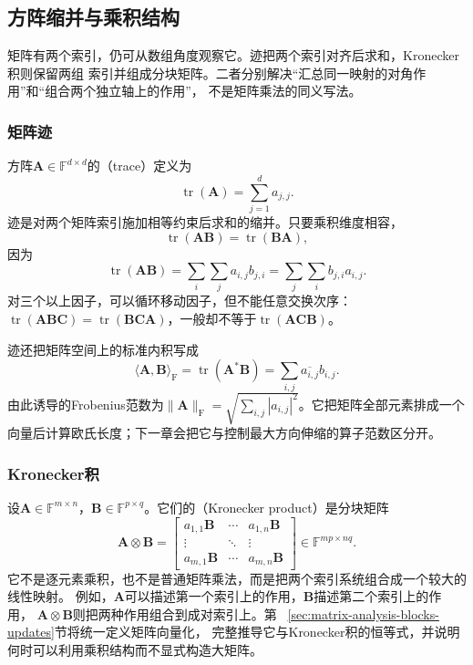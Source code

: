 \subsection{方阵缩并与乘积结构}

矩阵有两个索引，仍可从数组角度观察它。迹把两个索引对齐后求和，Kronecker积则保留两组
索引并组成分块矩阵。二者分别解决“汇总同一映射的对角作用”和“组合两个独立轴上的作用”，
不是矩阵乘法的同义写法。

\subsubsection{矩阵迹}

方阵$\bm{A}\in\mathbb{F}^{d\times d}$的（trace）定义为
\[
  \operatorname{tr}(\bm{A})
  =
  \sum_{j=1}^{d}a_{j,j}.
\]
迹是对两个矩阵索引施加相等约束后求和的缩并。只要乘积维度相容，
\begin{equation}
  \operatorname{tr}(\bm{A}\bm{B}) = \operatorname{tr}(\bm{B}\bm{A}), \label{eq:linear-algebra-trace-cyclic}
\end{equation}
因为
\[
  \operatorname{tr}(\bm{A}\bm{B})
  =
  \sum_i\sum_j a_{i,j}b_{j,i}
  =
  \sum_j\sum_i b_{j,i}a_{i,j}.
\]
对三个以上因子，可以循环移动因子，但不能任意交换次序：$\operatorname{tr}(\bm{A}\bm{B}\bm{C}) =\operatorname{tr}(\bm{B}\bm{C}\bm{A})$，一般却不等于$\operatorname{tr}(\bm{A}\bm{C}\bm{B})$。

迹还把矩阵空间上的标准内积写成
\[
  \langle\bm{A},\bm{B}\rangle_{\mathrm{F}}
  =
  \operatorname{tr}(\bm{A}^{*}\bm{B})
  =
  \sum_{i,j}\overline{a_{i,j}}b_{i,j}.
\]
由此诱导的Frobenius范数为$\lVert\bm{A}\rVert_{\mathrm{F}} =\sqrt{\sum_{i,j}|a_{i,j}|^2}$。它把矩阵全部元素排成一个向量后计算欧氏长度；下一章会把它与控制最大方向伸缩的算子范数区分开。

\subsubsection{Kronecker积}

设$\bm{A}\in\mathbb{F}^{m\times n}$，$\bm{B}\in\mathbb{F}^{p\times q}$。它们的（Kronecker product）是分块矩阵
\begin{equation}
  \bm{A}\otimes\bm{B} = \begin{bmatrix} a_{1,1}\bm{B}&\cdots&a_{1,n}\bm{B}\\ \vdots&\ddots&\vdots\\ a_{m,1}\bm{B}&\cdots&a_{m,n}\bm{B} \end{bmatrix} \in\mathbb{F}^{mp\times nq}. \label{eq:linear-algebra-kronecker-product}
\end{equation}
它不是逐元素乘积，也不是普通矩阵乘法，而是把两个索引系统组合成一个较大的线性映射。
例如，$\bm{A}$可以描述第一个索引上的作用，$\bm{B}$描述第二个索引上的作用，
$\bm{A}\otimes\bm{B}$则把两种作用组合到成对索引上。第
~\ref{sec:matrix-analysis-blocks-updates}节将统一定义矩阵向量化，
完整推导它与Kronecker积的恒等式，并说明何时可以利用乘积结构而不显式构造大矩阵。

